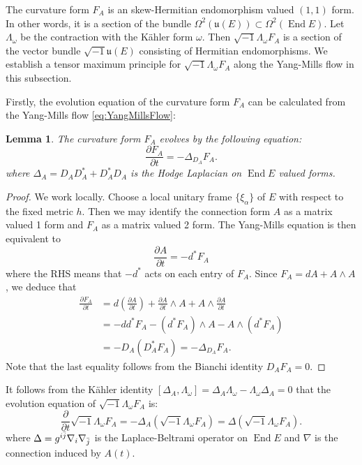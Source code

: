 \documentclass[11pt]{amsart}
\theoremstyle{plain}
\newtheorem{lem}[thm]{Lemma}
\theoremstyle{definition}
\numberwithin{equation}{section}
\DeclareMathOperator{\End}{End}
\newcommand{\Li}[1]{\mathfrak{#1}}
\begin{document}
The curvature form $F_A$ is an skew-Hermitian endomorphism valued $(1,1)$ form. In other words, it is a section of the bundle $\Omega^2(\Li{u}(E))\subset\Omega^2(\End E)$. Let $\Lambda_\omega$ be the contraction with the K\"{a}hler form $\omega$. Then $\sqrt{-1}\Lambda_\omega F_A$ is a section of the vector bundle $\sqrt{-1}\Li{u}(E)$ consisting of Hermitian endomorphisms. We establish a tensor maximum principle for $\sqrt{-1}\Lambda_\omega F_A$ along the Yang-Mills flow in this subsection. 

Firstly, the evolution equation of the curvature form $F_A$ can be calculated from the Yang-Mills flow \ref{eq:YangMillsFlow}:
\begin{lem}
    The curvature form $F_A$ evolves by the following equation:
    \begin{equation}
        \frac{\partial F_A}{\partial t}=-\Delta_{D_A}F_A.
    \end{equation}
    where $\Delta_A=D_AD_A^*+D_A^*D_A$ is the Hodge Laplacian on $\End E$ valued forms.
\end{lem}
\begin{proof}
    We work locally. Choose a local unitary frame $\{\xi_\alpha\}$ of $E$ with respect to the fixed metric $h$. Then we may identify the connection form $A$ as a matrix valued 1 form and $F_A$ as a matrix valued 2 form. The Yang-Mills equation is then equivalent to 
    \[\frac{\partial A}{\partial t}=-d^*F_A\]
    where the RHS means that $-d^*$ acts on each entry of $F_A$. Since $F_A=dA+A\wedge A$, we deduce that
    \begin{align*}
        \frac{\partial F_A}{\partial t}& =d\left(\frac{\partial A}{\partial t}\right)+\frac{\partial A}{\partial t}\wedge A+A\wedge\frac{\partial A}{\partial t}\\
        & =-dd^*F_A-(d^*F_A)\wedge A-A\wedge(d^*F_A)\\
        & =-D_A(D_A^*F_A)=-\Delta_{D_A}F_A.
    \end{align*}
    Note that the last equality follows from the Bianchi identity $D_AF_A=0$.
\end{proof}

It follows from the K\"{a}hler identity $[\Delta_A,\Lambda_\omega]=\Delta_A\Lambda_\omega-\Lambda_\omega\Delta_A=0$ that the evolution equation of $\sqrt{-1}\Lambda_\omega F_A$ is:
\begin{equation}\label{eq:EvolutionContractedCurvature}
    \frac{\partial}{\partial t}\sqrt{-1}\Lambda_\omega F_A=-\Delta_A (\sqrt{-1}\Lambda_\omega F_A)=\Delta(\sqrt{-1}\Lambda_\omega F_A).
\end{equation}
where $\Delta=g^{i\Bar{j}}\nabla_i\nabla_{\Bar{j}}$ is the Laplace-Beltrami operator on $\End E$ and $\nabla$ is the connection induced by $A(t)$.
\end{document}
